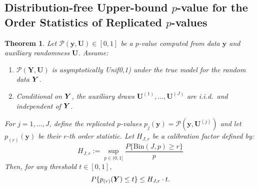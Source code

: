 \documentclass[
  12pt]{article}
\theoremstyle{plain}
\newtheorem{theorem}{Theorem}[section]
\theoremstyle{definition}
\theoremstyle{remark}
\begin{document}
\subsection{Distribution-free Upper-bound $p$-value for the Order Statistics of Replicated $p$-values}

\begin{theorem}\label{thm:upperbound}
Let $\mathcal{P}(\bm{y},\bm{U})\in[0,1]$ be a $p$-value computed from data $\bm{y}$ and auxiliary randomness $\bm{U}$. Assume:
\begin{enumerate}
    \item $\mathcal{P}(\bm{Y},\bm{U})$ is asymptotically Unif0,1) under the true model for the random data $\bm{Y}$.
    \item Conditional on $\bm{Y}$, the auxiliary draws $\bm{U}^{(1)},\ldots,\bm{U}^{(J)}$ are i.i.d.\ and independent of $\bm{Y}$.
\end{enumerate}
For $j=1,\ldots,J$, define the replicated $p$-values $p_j(\bm{y})=\mathcal{P}(\bm{y},\bm{U}^{(j)})$ and let $p_{(r)}(\bm{y})$ be their $r$-th order statistic. Let $H_{J,r}$ be a calibration factor defined by:
\begin{equation}
H_{J,r}:=\sup_{p\in(0,1]} \frac{P\{\mathrm{Bin}(J,p)\ge r\}}{p}
\end{equation}
Then, for any threshold $t\in[0,1]$,
\begin{equation}
P\{p_{(r)}(\bm{Y})\le t\} \le H_{J,r} \cdot t.
\end{equation}
\end{theorem}
\end{document}
